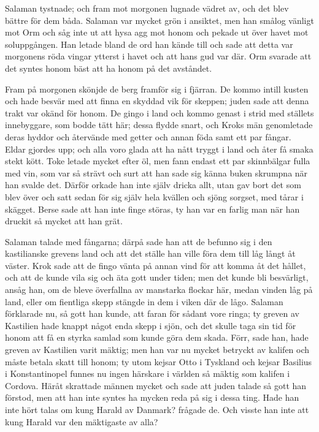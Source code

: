 \initial Salaman tystnade; och fram mot morgonen lugnade vädret av, och det blev bättre för dem båda. Salaman var mycket grön i ansiktet, men han smålog vänligt mot Orm och såg inte ut att hysa agg mot honom och pekade ut över havet mot soluppgången. Han letade bland de ord han kände till och sade att detta var morgonens röda vingar ytterst i havet och att hans gud var där. Orm svarade att det syntes honom bäst att ha honom på det avståndet.

\initial Fram på morgonen skönjde de berg framför sig i fjärran. De kommo intill kusten och hade besvär med att finna en skyddad vik för skeppen; juden sade att denna trakt var okänd för honom. De gingo i land och kommo genast i strid med ställets innebyggare, som bodde tätt här; dessa flydde snart, och Kroks män genomletade deras hyddor och återvände med getter och annan föda samt ett par fångar. Eldar gjordes upp; och alla voro glada att ha nått tryggt i land och åter få smaka stekt kött. Toke letade mycket efter öl, men fann endast ett par skinnbälgar fulla med vin, som var så strävt och surt att han sade sig känna buken skrumpna när han svalde det. Därför orkade han inte själv dricka allt, utan gav bort det som blev över och satt sedan för sig själv hela kvällen och sjöng sorgset, med tårar i skägget. Berse sade att han inte finge störas, ty han var en farlig man när han druckit så mycket att han grät.

\initial Salaman talade med fångarna; därpå sade han att de befunno sig i den kastilianske grevens land och att det ställe han ville föra dem till låg långt åt väster. Krok sade att de fingo vänta på annan vind för att komma åt det hållet, och att de kunde vila sig och äta gott under tiden; men det kunde bli besvärligt, ansåg han, om de bleve överfallna av manstarka flockar här, medan vinden låg på land, eller om fientliga skepp stängde in dem i viken där de lågo. Salaman förklarade nu, så gott han kunde, att faran för sådant vore ringa; ty greven av Kastilien hade knappt något enda skepp i sjön, och det skulle taga sin tid för honom att få en styrka samlad som kunde göra dem skada. Förr, sade han, hade greven av Kastilien varit mäktig; men han var nu mycket betryckt av kalifen och måste betala skatt till honom; ty utom kejsar Otto i Tyskland och kejsar Basilius i Konstantinopel funnes nu ingen härskare i världen så mäktig som kalifen i Cordova. Häråt skrattade männen mycket och sade att juden talade så gott han förstod, men att han inte syntes ha mycken reda på sig i dessa ting. Hade han inte hört talas om kung Harald av Danmark? frågade de. Och visste han inte att kung Harald var den mäktigaste av alla?

